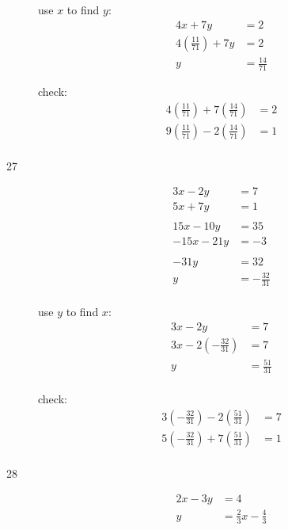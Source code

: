 \documentclass[fleqn,addpoints]{exam}
\begin{document}
\begin{description}
use $x$ to find $y$:
\begin{align*}
  4x+7y &= 2 \\
  4\left( \frac{11}{71} \right)+7y &= 2 \\
  y &= \frac{14}{71}
\end{align*}

\vspace{0.2 cm}
\vspace{0.2 cm}

check:
\begin{align*}
  4\left( \frac{11}{71} \right)+7\left( \frac{14}{71} \right) &= 2 \\
  9\left( \frac{11}{71} \right) - 2\left( \frac{14}{71} \right) &= 1 \\
\end{align*}

\item[27]
\begin{align*}
  3x-2y &= 7 \\
  5x + 7y &= 1 \\
  \\
  15x-10y &= 35 \\
  -15x - 21y &= -3 \\
  \\
  -31y &= 32 \\
  y &= - \frac{32}{31} \\
\end{align*}

use $y$ to find $x$:
\begin{align*}
  3x-2y &= 7 \\
  3x-2\left( - \frac{32}{31} \right) &= 7 \\
  y &= \frac{51}{31} \\
\end{align*}

\vspace{0.2 cm}
\vspace{0.2 cm}

check:
\begin{align*}
  3\left( - \frac{32}{31} \right)-2\left( \frac{51}{31} \right) &= 7 \\
  5\left( - \frac{32}{31} \right) + 7\left( \frac{51}{31} \right) &= 1 \\
\end{align*}

\item[28]
\begin{align*}
  2x-3y &= 4 \\
  y &= \frac{2}{3} x - \frac{4}{3}
\end{align*}


\end{description}
\end{document}
